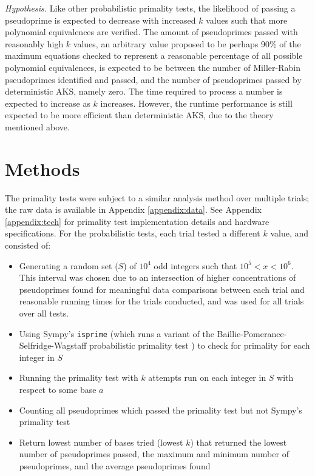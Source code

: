 \documentclass{article}
\begin{document}
\emph{Hypothesis.} Like other probabilistic primality tests, the likelihood of passing a pseudoprime is expected to decrease with increased $k$ values such that more polynomial equivalences are verified. The amount of pseudoprimes passed with reasonably high $k$ values, an arbitrary value proposed to be perhaps 90\% of the maximum equations checked to represent a reasonable percentage of all possible polynomial equivalences, is expected to be between the number of Miller-Rabin pseudoprimes identified and passed, and the number of pseudoprimes passed by deterministic AKS, namely zero. The time required to process a number is expected to increase as $k$ increases. However, the runtime performance is still expected to be more efficient than deterministic AKS, due to the theory mentioned above.

\section{Methods}
The primality tests were subject to a similar analysis method over multiple trials; the raw data is available in Appendix \ref{appendix:data}. See Appendix \ref{appendix:tech} for primality test implementation details and hardware specifications.
For the probabilistic tests, each trial tested a different $k$ value, and consisted of:

\begin{itemize}
    \item{Generating a random set ($S$) of $10^4$ odd integers such that $10^5 < x < 10^6$. This interval was chosen due to an intersection of higher concentrations of pseudoprimes found for meaningful data comparisons between each trial and reasonable running times for the trials conducted, and was used for all trials over all tests.}
    \item{Using Sympy's \texttt{isprime} (which runs a variant of the Baillie-Pomerance-Selfridge-Wagstaff probabilistic primality test \cite{sympy_number_2021}) to check for primality for each integer in $S$}
    \item{Running the primality test with $k$ attempts run on each integer in $S$ with respect to some base $a$}
    \item{Counting all pseudoprimes which passed the primality test but not Sympy's primality test}
    \item{Return lowest number of bases tried (lowest $k$) that returned the lowest number of pseudoprimes passed, the maximum and minimum number of pseudoprimes, and the average pseudoprimes found}
\end{itemize}
\end{document}
